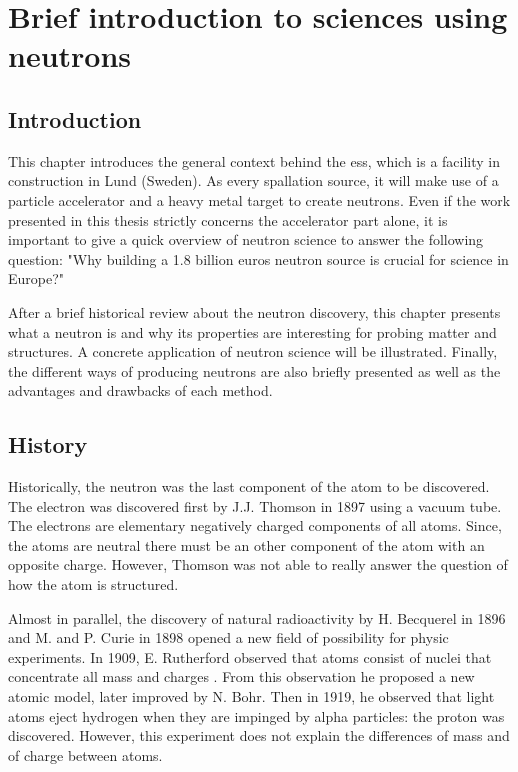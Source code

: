 \chapter{Brief introduction to sciences using neutrons}
\cleardoublepage

\minitoc

\section{Introduction}
\begin{refsection}
  \label{ch1:Introduction}
  This chapter introduces the general context behind the \acrfull{ess}, which is a facility in construction in Lund (Sweden). As every spallation source, it will make use of a particle accelerator and a heavy metal target to create neutrons. Even if the work presented in this thesis strictly concerns the accelerator part alone, it is important to give a quick overview of neutron science to answer the following question: "Why building a 1.8 \texteuro billion euros neutron source is crucial for science in Europe?"

  After a brief historical review about the neutron discovery, this chapter presents what a neutron is and why its properties are interesting for probing matter and structures. A concrete application of neutron science will be illustrated. Finally, the different ways of producing neutrons are also briefly presented as well as the advantages and drawbacks of each method.

  \section{History}
  Historically, the neutron was the last component of the atom to be discovered. The electron was discovered first by J.J. Thomson in 1897 using a vacuum tube. The electrons are elementary negatively charged components of all atoms. Since, the atoms are neutral there must be an other component of the atom with an opposite charge. However, Thomson was not able to really answer the question of how the atom is structured.

  Almost in parallel, the discovery of natural radioactivity by H. Becquerel in 1896 and M. and P. Curie in 1898 opened a new field of possibility for physic experiments. In 1909, E. Rutherford observed that atoms consist of nuclei that concentrate all mass and charges \cite{Rutherford:1911zz}.
  From this observation he proposed a new atomic model, later improved by N. Bohr. Then in 1919, he observed that light atoms eject hydrogen when they are impinged by alpha particles: the proton was discovered. However, this experiment does not explain the differences of mass and of charge between atoms.


\end{refsection}
